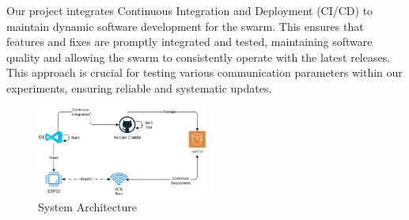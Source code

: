\documentclass{report}
\begin{document}
Our project integrates Continuous Integration and Deployment (CI/CD) to maintain dynamic software development for the swarm. This ensures that features and fixes are promptly integrated and tested, maintaining software quality and allowing the swarm to consistently operate with the latest releases. This approach is crucial for testing various communication parameters within our experiments, ensuring reliable and systematic updates.

\begin{figure}[h]
    \centering
    \includegraphics[width=0.5\textwidth]{architecture.png}
    \caption{System Architecture}
    \label{fig:architecture}
\end{figure}
\end{document}

